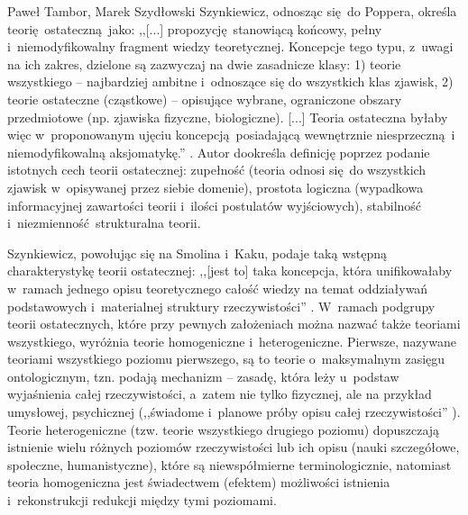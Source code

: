 \begin{artplenv2auth}{Paweł Tambor, Marek Szydłowski}
Szynkiewicz, odnosząc się~do Poppera, określa teorię~ostateczną~jako: ,,[...] propozycję~stanowiącą końcowy, pełny i~niemodyfikowalny fragment wiedzy teoretycznej. Koncepcje tego typu, z~uwagi na ich zakres, dzielone są zazwyczaj na dwie zasadnicze klasy: 1) teorie wszystkiego -- najbardziej ambitne i~odnoszące się do wszystkich klas zjawisk, 2) teorie ostateczne (cząstkowe) -- opisujące wybrane, ograniczone obszary przedmiotowe (np. zjawiska fizyczne, biologiczne). [...] Teoria ostateczna byłaby więc w~proponowanym ujęciu koncepcją~posiadającą wewnętrznie niesprzeczną~i niemodyfikowalną aksjomatykę.''
\parencite[][s.~1274–1275]{szynkiewicz_teorie_2011}. %
 Autor dookreśla definicję poprzez podanie istotnych cech teorii ostatecznej: zupełność (teoria odnosi się~do wszystkich zjawisk w~opisywanej przez siebie domenie), prostota logiczna (wypadkowa informacyjnej zawartości teorii i~ilości postulatów wyjściowych), stabilność i~niezmienność~strukturalna teorii.

Szynkiewicz, powołując się na Smolina i~Kaku, podaje taką wstępną charakterystykę teorii ostatecznej: ,,[jest to] taka koncepcja, która unifikowałaby w~ramach jednego opisu teoretycznego całość wiedzy na temat oddziaływań podstawowych i~materialnej struktury rzeczywistości''
\parencite[][s.~16]{szynkiewicz_teorie_2009}. %
 W~ramach podgrupy teorii ostatecznych, które przy pewnych założeniach można nazwać także teoriami wszystkiego, wyróżnia teorie homogeniczne i~heterogeniczne. Pierwsze, nazywane teoriami wszystkiego poziomu pierwszego, są to teorie o~maksymalnym zasięgu ontologicznym, tzn. podają mechanizm -- zasadę, która leży u~podstaw wyjaśnienia całej rzeczywistości, a~zatem nie tylko fizycznej, ale na przykład umysłowej, psychicznej (,,świadome i~planowe próby opisu całej rzeczywistości'' 
\parencite[][s.~30]{szynkiewicz_teorie_2009}%
). Teorie heterogeniczne (tzw. teorie wszystkiego drugiego poziomu) dopuszczają istnienie wielu różnych poziomów rzeczywistości lub ich opisu (nauki szczegółowe, społeczne, humanistyczne), które są niewspółmierne terminologicznie, natomiast teoria homogeniczna jest świadectwem (efektem) możliwości istnienia i~rekonstrukcji redukcji między tymi poziomami.


\end{artplenv2auth}
